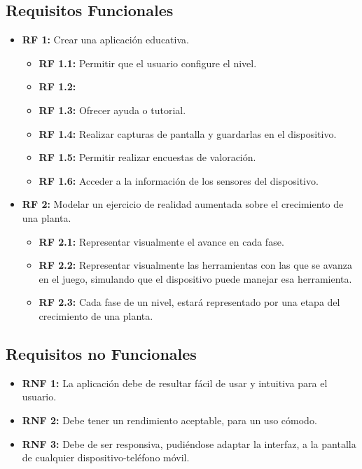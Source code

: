 \subsection{Requisitos Funcionales}
 \begin{itemize}
	\item \textbf{RF 1:} Crear una aplicación educativa.
	\begin{itemize}
	\item \textbf{RF 1.1:} Permitir que el usuario configure el nivel.
	\item \textbf{RF 1.2:} 
	\item \textbf{RF 1.3:} Ofrecer ayuda o tutorial.	
	\item \textbf{RF 1.4:} Realizar capturas de pantalla y guardarlas en el dispositivo.
	\item \textbf{RF 1.5:} Permitir realizar encuestas de valoración.
	\item \textbf{RF 1.6:} Acceder a la información de los sensores del dispositivo.
	
	\end{itemize} 
	\item \textbf{RF 2:} Modelar un ejercicio de realidad aumentada sobre el crecimiento de una planta.
	\begin{itemize}
	\item \textbf{RF 2.1:} Representar visualmente el avance en cada fase.
	\item \textbf{RF 2.2:} Representar visualmente las herramientas con las que se avanza en el juego, simulando que el dispositivo puede manejar esa herramienta.
	\item \textbf{RF 2.3:} Cada fase de un nivel, estará representado por una etapa del crecimiento de una planta.
	
	\end{itemize} 
	
	
\end{itemize}
\subsection{Requisitos no Funcionales}
\begin{itemize}
	\item \textbf{RNF 1:} La aplicación debe de resultar fácil de usar y intuitiva para el usuario.
	\item \textbf{RNF 2:} Debe tener un rendimiento aceptable, para un uso cómodo.
	\item \textbf{RNF 3:} Debe de ser responsiva, pudiéndose adaptar la interfaz, a la pantalla de cualquier dispositivo-teléfono móvil.
\end{itemize}
